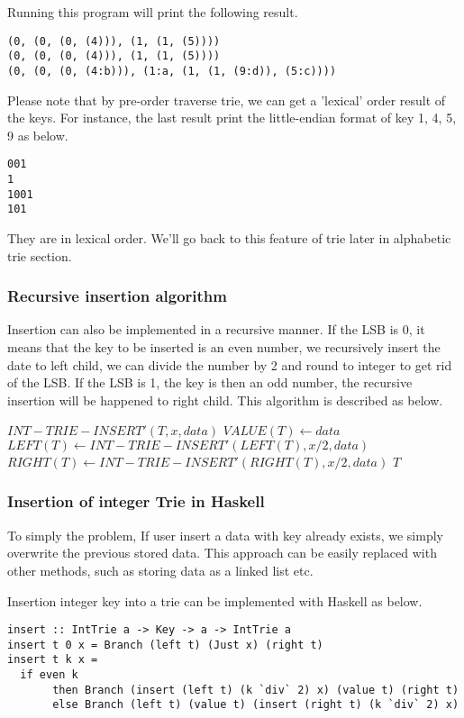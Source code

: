 \documentclass{article}
\begin{document}
Running this program will print the following result.

\begin{verbatim}
(0, (0, (0, (4))), (1, (1, (5))))
(0, (0, (0, (4))), (1, (1, (5))))
(0, (0, (0, (4:b))), (1:a, (1, (1, (9:d)), (5:c))))
\end{verbatim}

Please note that by pre-order traverse trie, we can get a 'lexical' order
result of the keys. For instance, the last result print the little-endian
format of key 1, 4, 5, 9 as below.

\begin{verbatim}
001
1
1001
101
\end{verbatim}

They are in lexical order. We'll go back to this feature of trie later in 
alphabetic trie section.

\subsubsection{Recursive insertion algorithm}
Insertion can also be implemented in a recursive manner. If the LSB is 0, it 
means that the key to be inserted is an even number, we recursively insert the
date to left child, we can divide the number by 2 and round to integer to get
rid of the LSB. If the LSB is 1, the key is then an odd number, the recursive
insertion will be happened to right child. This algorithm is described as below.

\begin{algorithmic}
\STATE $INT-TRIE-INSERT'(T, x, data)$
    \STATE $VALUE(T) \leftarrow data$
  \ELSE
      \STATE $LEFT(T) \leftarrow INT-TRIE-INSERT'(LEFT(T), x/2, data)$
    \ELSE
      \STATE $RIGHT(T) \leftarrow INT-TRIE-INSERT'(RIGHT(T), x/2, data)$
    \ENDIF
  \ENDIF
  \RETURN $T$
\end{algorithmic}

\subsubsection*{Insertion of integer Trie in Haskell}
To simply the problem, If user insert a data with key already exists, we simply
overwrite the previous stored data. This approach can be easily replaced with 
other methods, such as storing data as a linked list etc.

Insertion integer key into a trie can be implemented with Haskell as below.

\lstset{language=Haskell}
\begin{lstlisting}
insert :: IntTrie a -> Key -> a -> IntTrie a
insert t 0 x = Branch (left t) (Just x) (right t)
insert t k x = 
  if even k
       then Branch (insert (left t) (k `div` 2) x) (value t) (right t)
       else Branch (left t) (value t) (insert (right t) (k `div` 2) x)
\end{lstlisting}
\end{document}
